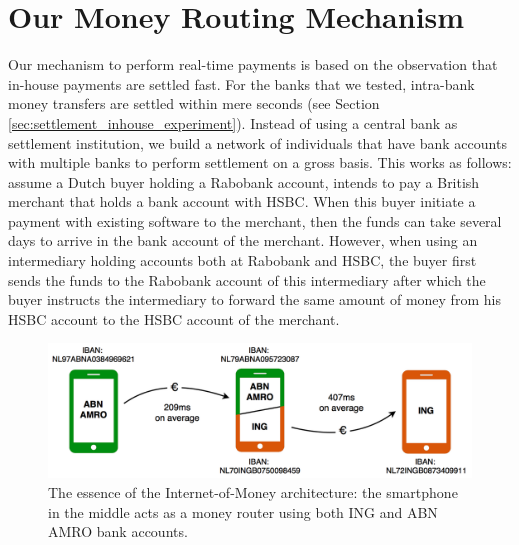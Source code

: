 \section{Our Money Routing Mechanism}

Our mechanism to perform real-time payments is based on the observation that in-house payments are settled fast.
For the banks that we tested, intra-bank money transfers are settled within mere seconds (see Section \ref{sec:settlement_inhouse_experiment}).
Instead of using a central bank as settlement institution, we build a network of individuals that have bank accounts with multiple banks to perform settlement on a gross basis.
This works as follows: assume a Dutch buyer holding a Rabobank account, intends to pay a British merchant that holds a bank account with HSBC.
When this buyer initiate a payment with existing software to the merchant, then the funds can take several days to arrive in the bank account of the merchant.
However, when using an intermediary holding accounts both at Rabobank and HSBC, the buyer first sends the funds to the Rabobank account of this intermediary after which the buyer instructs the intermediary to forward the same amount of money from his HSBC account to the HSBC account of the merchant.

\begin{figure}[t]
	\centering
	\includegraphics[width=\textwidth]{iom/assets/internet_of_money.png}
	\caption{The essence of the Internet-of-Money architecture: the smartphone in the middle acts as a money router using both ING and ABN AMRO bank accounts.}
	\label{fig:internet_of_money}
\end{figure}

